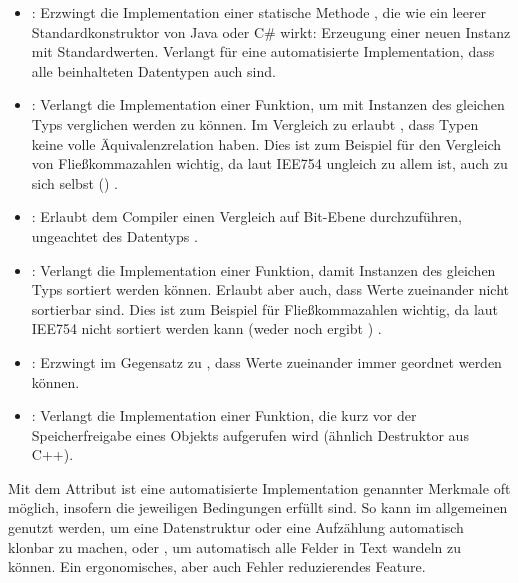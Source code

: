 \begin{itemize}
	\item {}: Erzwingt die Implementation einer statische Methode , die wie ein leerer Standardkonstruktor von Java oder C\# wirkt: Erzeugung einer neuen Instanz mit Standardwerten.
	Verlangt für eine automatisierte Implementation, dass alle beinhalteten Datentypen auch  sind.
	
	\item {}: Verlangt die Implementation einer Funktion, um mit Instanzen des gleichen Typs verglichen werden zu können.
	Im Vergleich zu  erlaubt , dass Typen keine volle Äquivalenzrelation haben.
	Dies ist zum Beispiel für den Vergleich von Fließkommazahlen wichtig, da laut IEE754   ungleich zu allem ist, auch zu sich selbst () \cite{wiki:nan}\cite[272-275]{rust:orly_programming}\cite{rust:doc:partialeq}.
	
	\item {}: Erlaubt dem Compiler einen Vergleich auf Bit-Ebene durchzuführen, ungeachtet des Datentyps \cite{rust:doc:eq}.
	
	\item {}: Verlangt die Implementation einer Funktion, damit Instanzen des gleichen Typs sortiert werden können. Erlaubt aber auch, dass Werte zueinander nicht sortierbar sind.
	Dies ist zum Beispiel für Fließkommazahlen wichtig, da laut IEE754   nicht sortiert werden kann (weder  noch  ergibt ) \cite{wiki:nan}\cite[275-277]{rust:orly_programming}\cite{rust:doc:partialord}.
	
	\item {}: Erzwingt im Gegensatz zu , dass Werte zueinander immer geordnet werden können.
	
	\item {}: Verlangt die Implementation einer Funktion, die kurz vor der Speicherfreigabe eines Objekts aufgerufen wird (ähnlich Destruktor aus C++).
\end{itemize}

Mit dem Attribut \rustcinline{#[derive(..)]} ist eine automatisierte Implementation genannter Merkmale oft möglich, insofern die jeweiligen Bedingungen erfüllt sind.
So kann im allgemeinen  genutzt werden, um eine Datenstruktur oder eine Aufzählung automatisch klonbar zu machen, oder , um automatisch alle Felder in Text wandeln zu können.
Ein ergonomisches, aber auch Fehler reduzierendes Feature.

